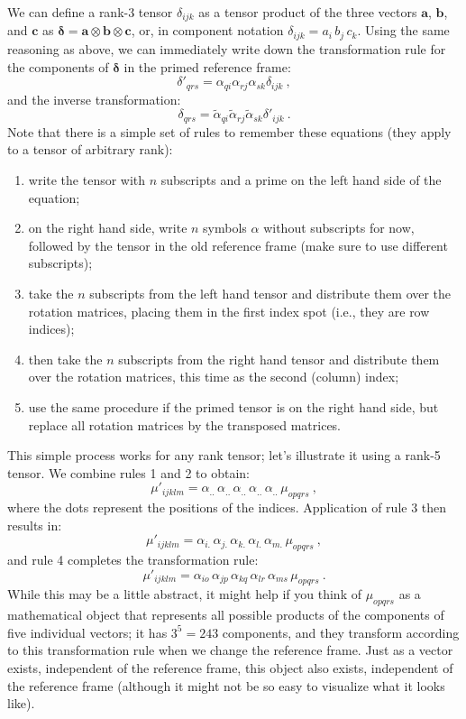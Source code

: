 We can define a rank-3 tensor $\delta_{ijk}$ as a tensor product of the three vectors $\mathbf{a}$, $\mathbf{b}$, and $\mathbf{c}$ as $\bm{\delta} = \mathbf{a}\otimes\mathbf{b}\otimes\mathbf{c}$, or, in component notation $\delta_{ijk}=a_i\,b_j\,c_k$. Using the same reasoning as above, we can immediately write down the transformation rule for the components of $\bm{\delta}$ in the primed reference frame:
\begin{equation}
	\delta'_{qrs} = \alpha_{qi}\alpha_{rj}\alpha_{sk}\delta_{ijk}\ ,
\end{equation}
and the inverse transformation:
\begin{equation}
	\delta_{qrs} = \tilde{\alpha}_{qi}\tilde{\alpha}_{rj}\tilde{\alpha}_{sk}\delta'_{ijk}\ .
\end{equation}
Note that there is a simple set of rules to remember these equations (they apply to a tensor of arbitrary rank):
\begin{enumerate}
	\item write the tensor with $n$ subscripts and a prime on the left hand side of the equation;
	\item on the right hand side, write $n$ symbols $\alpha$ without subscripts for now, followed by the tensor in the old reference frame (make sure to use different subscripts);
	\item take the $n$ subscripts from the left hand tensor and distribute them over the rotation matrices, placing them in the first index spot (i.e., they are row indices);
	\item then take the $n$ subscripts from the right hand tensor and distribute them over the rotation matrices, this time as the second (column) index;
	\item use the same procedure if the primed tensor is on the right hand side, but replace all rotation matrices by the transposed matrices.
\end{enumerate} 
This simple process works for any rank tensor; let's illustrate it using a rank-5 tensor.  We combine rules 1 and 2 to obtain:
\[
	\mu'_{ijklm} = \alpha_{..}\,\alpha_{..}\,\alpha_{..}\,\alpha_{..}\,\alpha_{..}\, \mu_{opqrs}\ ,
\]
where the dots represent the positions of the indices. Application of rule 3 then results in:
\[
	\mu'_{ijklm} = \alpha_{i.}\,\alpha_{j.}\,\alpha_{k.}\,\alpha_{l.}\,\alpha_{m.}\, \mu_{opqrs}\ ,
\]
and rule 4 completes the transformation rule:
\begin{equation}
	\mu'_{ijklm} = \alpha_{io}\,\alpha_{jp}\,\alpha_{kq}\,\alpha_{lr}\,\alpha_{ms}\, \mu_{opqrs}\ .\label{\chabbr:eq:rankfive}
\end{equation}
While this may be a little abstract, it might help if you think of $\mu_{opqrs}$ as a mathematical object that represents all possible products of the components of five individual vectors; it has $3^5=243$ components, and they transform according to this transformation rule when we change the reference frame. Just as a vector exists, independent of the reference frame, this object also exists, independent of the reference frame (although it might not be so easy to visualize what it looks like).  

